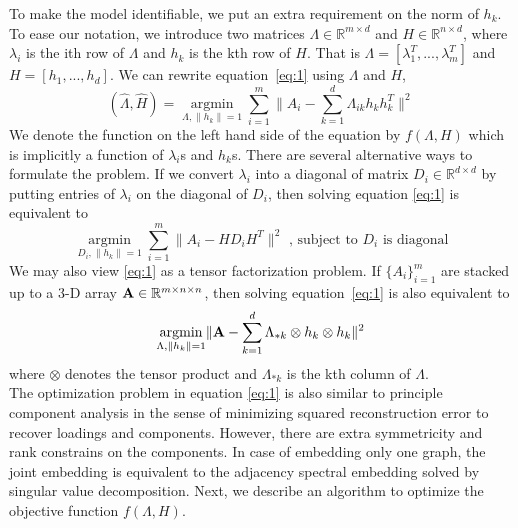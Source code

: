 \documentclass[10pt,journal,compsoc]{IEEEtran}
\begin{document}
\noindent  To make the model identifiable, we put an extra requirement on the norm of $h_k$. To ease our notation, we introduce two matrices $\Lambda \in \mathbb{R}^{m \times d}$ and $H\in \mathbb{R}^{n \times d}$, where $\lambda_i$ is the ith row of $\Lambda$ and $h_k$ is the kth row of $H$. That is $\Lambda=[\lambda_1^T,...,\lambda_m^T]$ and $H=[h_1,...,h_d]$. We can rewrite equation~\eqref{eq:1} using $\Lambda$ and $H$,
\begin{equation*}
(\hat{\Lambda},\hat{H}) = \underset{\Lambda,\|h_k\|=1}{\operatorname{argmin}} \sum\limits_{i=1}^{m} \| A_i- \sum\limits_{k=1}^{d} \Lambda_{ik} h_k h_k^T \|  ^2  
\end{equation*}
 We denote the function on the left hand side of the equation by $f(\Lambda,H)$ which is implicitly a function of $\lambda_i$s and $h_k$s. There are several alternative ways to formulate the problem. If we convert $\lambda_i$ into a diagonal of matrix $D_i \in \mathbb{R}^{d \times d}$ by putting entries of $\lambda_i$ on the diagonal of $D_i$, then solving equation \eqref{eq:1} is equivalent to
\[  \underset{D_i,\|h_k\|=1}{\operatorname{argmin}} \sum\limits_{i=1}^{m} \| A_i- H D_i H^T \|  ^2  \text{ , subject to $D_i$ is diagonal}\]
We may also view \eqref{eq:1} as a tensor factorization problem. If $\{A_i\}_{i=1}^m$ are stacked up to a 3-D array ${\bf A} \in \mathbb{R}^{m\times n \times n}$, then solving equation~\eqref{eq:1} is also equivalent to
\[  \underset{\Lambda,\|h_k\|=1}{\operatorname{argmin}}  \| {\bf A} - \sum\limits_{k=1}^{d} \Lambda_{*k} \otimes h_k \otimes h_k\|  ^2  \]
where $\otimes$ denotes the tensor product and $\Lambda_{*k}$ is the kth column of $\Lambda$. \\

\noindent The optimization problem in equation \eqref{eq:1} is also similar to principle component analysis in the sense of minimizing squared reconstruction error to recover loadings and components. However, there are extra symmetricity and rank constrains on the components. In case of embedding only one graph, the joint embedding is equivalent to the adjacency spectral embedding solved by singular value decomposition. Next, we describe an algorithm to optimize the objective function $f(\Lambda,H)$.  
\end{document}
